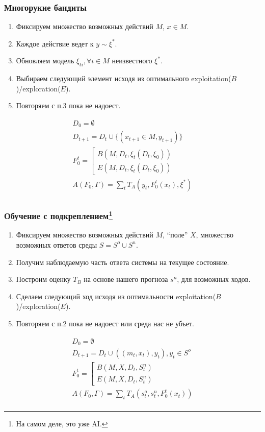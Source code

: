 \documentclass[14pt, fleqn, xcolor={dvipsnames, table}]{beamer}
\begin{document}
\begin{frame}
\frametitle{Многорукие бандиты}
\begin{enumerate}
	\item Фиксируем множество возможных действий $M$, $x\in M$.
	\item Каждое действие ведет к $y \sim \xi^*$.
	\item Обновляем модель $\xi_{ti}, \forall i \in M$ неизвестного $\xi^*$.
	\item Выбираем следующий элемент исходя из оптимального exploitation($B$)/exploration($E$).
	\item Повторяем с п.3 пока не надоест.
\end{enumerate}
$$\begin{array}{l}
D_0 = \emptyset \\
D_{t+1} = D_{t} \cup \{(x_{t+1} \in M, y_{t+1})\} \\
F_0^t = \left[\begin{array}{l}B(M, D_{t}, \xi_t(D_{t}, \xi_0))\\ E(M, D_{t}, \xi_t(D_{t}, \xi_0))\end{array}\right. \\
A(F_0, \Gamma) = \sum_{t} T_A(y_t, F_0^t(x_t), \xi^*) \\
\end{array}$$
\end{frame}

\begin{frame}
\frametitle{Обучение с подкреплением\footnote{На самом деле, это уже AI.}}
\footnotesize
\begin{enumerate}
	\item Фиксируем множество возможных действий $M$, ``поле'' $X$, множество возможных ответов среды $S = S^o \cup S^n$.
	\item Получим наблюдаемую часть ответа системы на текущее состояние.
	\item Построим оценку $T_B$ на основе нашего прогноза $s^n$, для возможных ходов.
	\item Сделаем следующий ход исходя из оптимальности exploitation($B$)/exploration($E$).
	\item Повторяем с п.2 пока не надоест или среда нас не убъет.
\end{enumerate}
$$\begin{array}{l}
D_0 = \emptyset \\
D_{t+1} = D_t \cup ((m_t,x_t), y_t), y_t \in S^o \\
F_0^t = \left[\begin{array}{l}B(M, X, D_{t}, S_t^n)\\ E(M, X, D_{t}, S_t^n)\end{array}\right. \\
A(F_0, \Gamma) = \sum_{t} T_A(s^o_t, s^n_t, F_0^t(x_t)) \\
\end{array}$$
\end{frame}
\end{document}
